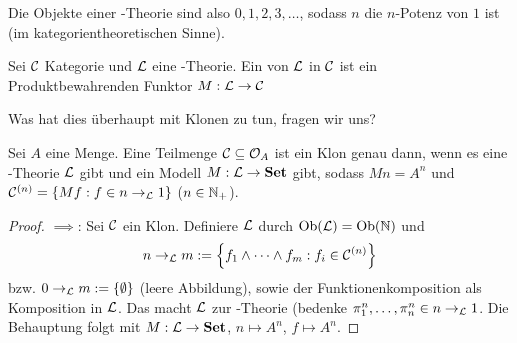\documentclass{book}
\begin{document}
\begin{remark}
    Die Objekte einer -Theorie sind also $0,1,2,3,\ldots$, sodass $n$ die $n$-Potenz von $1$ ist (im kategorientheoretischen Sinne).
\end{remark}

\begin{definition}
    Sei $\mathcal{C}$ Kategorie und $\mathcal{L}$ eine -Theorie. Ein  von $\mathcal{L}$ in $\mathcal{C}$ ist ein Produktbewahrenden Funktor $M:\mathcal{L}\rightarrow\mathcal{C}$ 
\end{definition}

Was hat dies überhaupt mit Klonen zu tun, fragen wir uns?

\begin{proposition}
    Sei $A$ eine Menge. Eine Teilmenge $\mathcal{C}\subseteq \mathcal{O}_A$ ist ein Klon genau dann, wenn es eine -Theorie $\mathcal{L}$ gibt und ein Modell $M:\mathcal{L}\rightarrow\mathbf{Set}$ gibt, sodass $Mn=A^n$ und $\mathcal{C}^{(n)}=\left\{Mf:f\in n\rightarrow_{\mathcal{L}} 1\right\}$ ($n\in\mathbb{N}_+$). 
\end{proposition}

\begin{proof}
    $\implies$: Sei $\mathcal{C}$ ein Klon. Definiere $\mathcal{L}$ durch $\mathop\mathrm{Ob}(\mathcal{L})=\mathop\mathrm{Ob}(\mathbb{N})$ und
    $$
    n\rightarrow_{\mathcal{L}} m:=\left\{f_1\wedge\cdots\wedge f_m:f_i\in\mathcal{C}^{(n)}\right\}
    $$
    bzw. $0\rightarrow_{\mathcal{L}} m:=\left\{\emptyset\right\}$ (leere Abbildung), sowie der Funktionenkomposition als Komposition in $\mathcal{L}$. Das macht $\mathcal{L}$ zur -Theorie (bedenke $\pi_1^n,\ldots,\pi^n_n\in n\rightarrow_{\mathcal{L}} 1$. Die Behauptung folgt mit $M:\mathcal{L}\rightarrow\mathbf{Set}$, $n\mapsto A^n$, $f\mapsto A^n$.
\end{proof}
\end{document}
